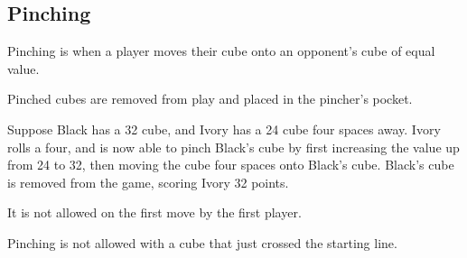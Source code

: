 \subsection{Pinching}\label{sec:pinching}
Pinching is when a player moves their cube onto an opponent's cube of equal value.

Pinched cubes are removed from play and placed in the pincher's pocket.

\example Suppose Black has a 32 cube, and Ivory has a 24 cube four spaces away. 
Ivory rolls a four, and is now able to pinch Black's cube by first increasing the value up from 24 to 32, then moving the cube four spaces onto Black's cube.
Black's cube is removed from the game, scoring Ivory 32 points.

\note It is not allowed on the first move by the first player.

\note Pinching is not allowed with a cube that just crossed the starting line.